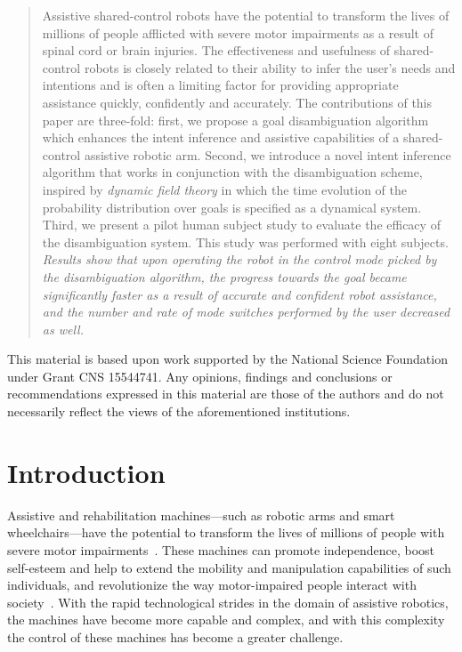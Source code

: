 \maketitle
\begin{abstract}
Assistive shared-control robots have the potential to transform the lives of millions of people afflicted with severe motor impairments as a result of spinal cord or brain injuries. The effectiveness and usefulness of shared-control robots is closely related to their ability to infer the user's needs and intentions and is often a limiting factor for providing appropriate assistance quickly, confidently and accurately. The contributions of this paper are three-fold: first, we propose a goal disambiguation algorithm which enhances the intent inference and assistive capabilities of a shared-control assistive robotic arm. Second, we introduce a novel intent inference algorithm that works in conjunction with the disambiguation scheme, inspired by \textit{dynamic field theory} in which the time evolution of the probability distribution over goals is specified as a dynamical system. Third, we present a pilot human subject study to evaluate the efficacy of the disambiguation system. This study was performed with eight subjects. \textit{Results show that upon operating the robot in the control mode picked by the disambiguation algorithm, the progress towards the goal became significantly faster as a result of accurate and confident robot assistance, and the number and rate of mode switches performed by the user decreased as well.} 
\end{abstract}
\begin{acknowledgements}
	This material is based upon work supported by the National Science Foundation under Grant CNS 15544741. Any opinions, findings and conclusions or
	recommendations expressed in this material are those of the authors and do
	not necessarily reflect the views of the aforementioned institutions.
\end{acknowledgements}
\section{Introduction}\label{sec:intro}

Assistive and rehabilitation machines---such as robotic arms and smart wheelchairs---have the potential to transform the lives of millions of people with severe motor impairments~\cite{laplante1992assistive}. These machines can promote independence, boost self-esteem and help to extend the mobility and manipulation capabilities of such individuals, and revolutionize the way motor-impaired people interact with society~\cite{scherer1996outcomes, huete2012personal}. With the rapid technological strides in the domain of assistive robotics, the machines have become more capable and complex, and with this complexity the control of these machines has become a greater challenge. 

